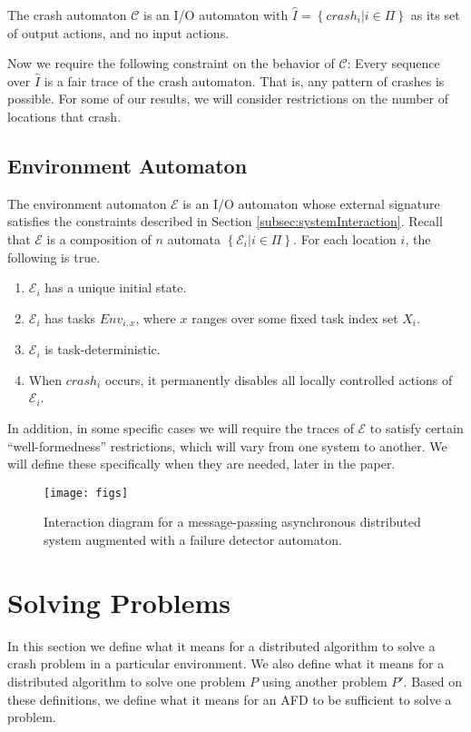 \documentclass[11pt]{article}
\numberwithin{theorem}{section}
\newcommand{\set}[1]{\left\{#1\right\}}
\begin{document}
The crash automaton $\mathcal{C}$ is an I/O automaton with
$\hat{I} = \set{crash_i | i \in \Pi}$ as its set of output actions,
and no input actions.

Now we require the following constraint on the behavior of
$\mathcal{C}$:  Every sequence over $\hat{I}$ is a fair trace of the
crash automaton.
That is, any pattern of crashes is possible.
For some of our results, we will consider restrictions on the number of locations that crash.

\subsection{Environment Automaton}
\label{subsec:environmentAutomaton}
The environment automaton $\mathcal{E}$ is an I/O automaton whose
external signature satisfies the constraints described in Section \ref{subsec:systemInteraction}. Recall that $\mathcal{E}$ is a composition of $n$ automata $\set{\mathcal{E}_i | i \in\Pi}$. For each location $i$, the following is true.
\begin{enumerate}
\item $\mathcal{E}_i$ has a unique initial state.
\item $\mathcal{E}_i$ has tasks $Env_{i,x}$, where $x$ ranges
over some fixed task index set $X_i$.
\item $\mathcal{E}_i$ is task-deterministic.
\item When $crash_i$ occurs, it permanently disables all locally controlled
actions of $\mathcal{E}_i$.
\end{enumerate}
In addition, in some specific cases we will require the traces of
$\mathcal{E}$ to satisfy certain ``well-formedness'' restrictions,
which will vary from one system to another.
We will define these specifically when they are needed, later in the
paper.

\begin{figure}[htpb]
	\centering
\texttt{[image: figs]}
	\caption{Interaction diagram for a message-passing asynchronous distributed system augmented with a failure detector automaton.}
	\label{fig:interaction_diagram}
\end{figure}




\section{Solving Problems}
\label{sec:solvingProblems}

In this section we define what it means for a distributed algorithm
to solve a crash problem in a particular environment.
We also define what it means for a distributed algorithm to solve one
problem $P$ using another problem $P'$. 
Based on these definitions, we define what it means for an AFD to
be sufficient to solve a problem.
\end{document}
